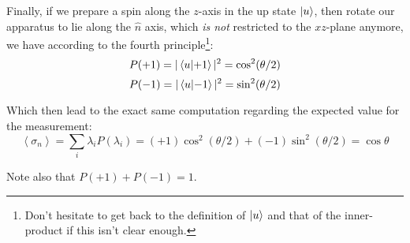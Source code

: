 \documentclass[solutions.tex]{subfiles}
\begin{document}
Finally, if we prepare a spin along the $z$-axis in the up
state $|u\rangle$, then rotate our apparatus to lie along the $\hat{n}$
axis, which \textit{is not} restricted to the $xz$-plane anymore,
we have according to the fourth principle\footnote{Don't hesitate
to get back to the definition of $|u\rangle$ and that of the inner-product
if this isn't clear enough.}:
\[
	P(+1) = |\left\langle u \middle| +1 \right\rangle|^2 = \cos^2(\theta/2)
\]
\[
	P(-1) = |\left\langle u \middle| -1 \right\rangle|^2 = \sin^2(\theta/2)
\]

Which then lead to the exact same computation regarding
the expected value for the measurement:
\[
	\left<\sigma_n\right> = \sum_i\lambda_iP(\lambda_i) =
		(+1)\cos^2(\theta/2) + (-1)\sin^2(\theta/2) = \boxed{\cos\theta}
\]

Note also that $P(+1)+P(-1) = 1$.
\end{document}
